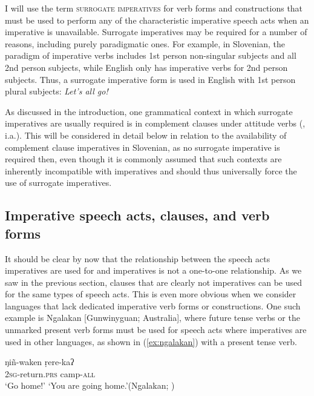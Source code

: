 \documentclass[output=paper,colorlinks,citecolor=brown]{langscibook}
\begin{document}
\noindent I will use the term \textsc{surrogate imperatives} \citep[following][]{zanuttini91,zanuttini97,rivero94} for verb forms and constructions that must be used to perform any of the characteristic imperative speech acts when an imperative is unavailable. Surrogate imperatives may be required for a number of reasons, including purely paradigmatic ones. For example, in Slovenian, the paradigm of imperative verbs includes 1st person non-singular subjects and all 2nd person subjects, while English only has imperative verbs for 2nd person subjects. Thus, a surrogate imperative form is used in English with 1st person plural subjects: \emph{Let's all go!}

As discussed in the introduction, one grammatical context in which surrogate imperatives are usually required is in complement clauses under attitude verbs (\citealt{zanuttini91,zanuttini97,rivero94,han98,han00}, i.a.). This will be considered in detail below in relation to the availability of complement clause imperatives in Slovenian, as no surrogate imperative is required then, even though it is commonly assumed that such contexts are inherently incompatible with imperatives and should thus universally force the use of surrogate imperatives.

\subsection{Imperative speech acts, clauses, and verb forms}
\label{subsec:act-clause-form}

It should be clear by now that the relationship between the speech acts imperatives are used for and imperatives is not a one-to-one relationship. As we saw in the previous section, clauses that are clearly not imperatives can be used for the same types of speech acts. This is even more obvious when we consider languages that lack dedicated imperative verb forms or constructions. One such example is Ngalakan [Gunwinyguan; Australia], where future tense verbs or the unmarked present verb forms must be used for speech acts where imperatives are used in other languages, as shown in (\ref{ex:ngalakan}) with a present tense verb.  

\ea \label{ex:ngalakan}
\gll ŋi\~n-waken ṛere-kaʔ\\
     \textsc{2sg}-return.\textsc{prs} camp-\textsc{all}\\
\ea `Go home!'
\ex `You are going home.'\hfill (Ngalakan; \citealt[39]{aikhenvald10})
\z
\z
\end{document}
